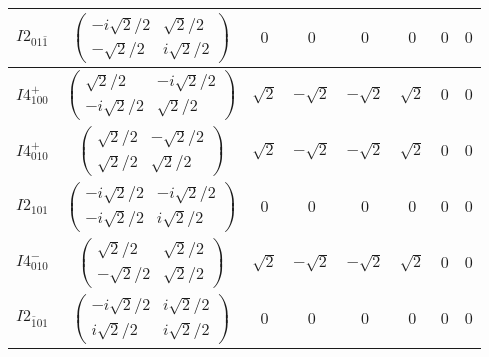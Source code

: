 \documentclass[3p,preprint]{elsarticle}
\begin{document}
\begin{table}[H]
{\begin{tabular}{|c|c||c|c|c|c|c|c|}
			$I2_{01\bar{1}}$ &		$\left(\begin{array}{cc} -i\sqrt{2}/2&\sqrt{2}/2 \\ -\sqrt{2}/2&i\sqrt{2}/2 \end{array}\right)$	&$0$ & $0$ & $0$ & $0$ & $0$ & $0$ \\ \hline
			$I4^{+}_{100}$ &		$\left(\begin{array}{cc} \sqrt{2}/2&-i\sqrt{2}/2 \\ -i\sqrt{2}/2&\sqrt{2}/2 \end{array}\right)$	&$\sqrt{2}$ & $-\sqrt{2}$ & $-\sqrt{2}$ & $\sqrt{2}$ & $0$ & $0$ \\ \hline
			$I4^{+}_{010}$ &		$\left(\begin{array}{cc} \sqrt{2}/2&-\sqrt{2}/2 \\ \sqrt{2}/2&\sqrt{2}/2 \end{array}\right)$	&$\sqrt{2}$ & $-\sqrt{2}$ & $-\sqrt{2}$ & $\sqrt{2}$ & $0$ & $0$ \\ \hline
			$I2_{101}$ &		$\left(\begin{array}{cc} -i\sqrt{2}/2&-i\sqrt{2}/2 \\ -i\sqrt{2}/2&i\sqrt{2}/2 \end{array}\right)$	&$0$ & $0$ & $0$ & $0$ & $0$ & $0$ \\ \hline
			$I4^{-}_{010}$ &		$\left(\begin{array}{cc} \sqrt{2}/2&\sqrt{2}/2 \\ -\sqrt{2}/2&\sqrt{2}/2 \end{array}\right)$	&$\sqrt{2}$ & $-\sqrt{2}$ & $-\sqrt{2}$ & $\sqrt{2}$ & $0$ & $0$ \\ \hline			
			$I2_{\bar{1}01}$ &		$\left(\begin{array}{cc} -i\sqrt{2}/2&i\sqrt{2}/2 \\ i\sqrt{2}/2&i\sqrt{2}/2 \end{array}\right)$	&$0$ & $0$ & $0$ & $0$ & $0$ & $0$ \\ \hline
		\end{tabular}
		}
\end{table}
\end{document}
